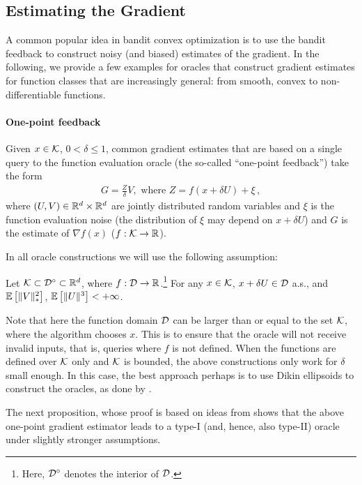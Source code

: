 \subsection{Estimating the Gradient}

A common popular idea in bandit convex optimization is to use the bandit feedback to construct noisy (and biased) estimates of the gradient.
In the following, we provide a few examples for oracles that construct gradient estimates for function classes that are increasingly general: from smooth, convex to non-differentiable functions.

\paragraph{One-point feedback}
Given $x\in \mathcal{K}$, $0<\delta\le 1$, common gradient estimates that are
based on a single query to the function evaluation oracle (the so-called
``one-point feedback'') take the form
\begin{align}
  \label{eq:one-point}
G = \frac{Z}{\delta}V, \textrm{ where } Z = f(x+\delta U) + \xi\,,
\end{align}
where $(U,V)\in \mathbb{R}^d\times \mathbb{R}^d$ are jointly distributed random variables
and $\xi$ is the function evaluation noise (the distribution of $\xi$ may depend on $x+\delta U$) and $G$ is the estimate of $\nabla f(x)$ ($f:\mathcal{K}\to \mathbb{R}$).

In all oracle constructions we will use the following assumption:
\begin{ass}
  \label{ass:gradbasic}
  Let $\mathcal{K} \subset \mathcal{D}^\circ \subset \mathbb{R}^d$, where $f:\mathcal{D} \to \mathbb{R}$.\footnote{Here, $\mathcal{D}^\circ$ denotes the interior of $\mathcal{D}$.}
  For any $x\in \mathcal{K}$, $x+\delta U \in \mathcal{D}$ a.s.,
  and $\mathbb{E}\left[\|V\|_*^2\right]$, $\mathbb{E}\left[ \|U\|^3 \right]<+\infty$.
\end{ass}
Note that here the function domain $\mathcal{D}$ can be larger than or equal to the set $\mathcal{K}$, where the algorithm chooses $x$. This is to ensure that the oracle will not receive invalid inputs, that is, queries where $f$ is not defined.
When the functions are defined over $\mathcal{K}$ only and $\mathcal{K}$ is bounded, the above constructions only work for $\delta$ small enough.
In this case, the best approach perhaps is to use Dikin ellipsoids to construct the oracles, as done by \citet{HaLe14:SOC}.

The next proposition, whose proof is based on ideas from \citet{spall1992multivariate} shows that the above one-point gradient estimator leads to a type-I (and, hence, also type-II) oracle under slightly stronger assumptions.

